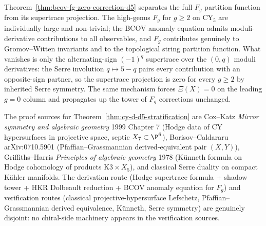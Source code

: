 \begin{remark}
\label{rem:cy-strat-d5-ghost-theorem}
Theorem~\ref{thm:bcov-fg-zero-correction-d5} separates the full
$F_g$ partition function from its supertrace projection. The
high-genus $F_g$ for $g \geq 2$ on CY$_5$ are individually large
and non-trivial; the BCOV anomaly equation admits moduli-derivative
contributions to all observables, and $F_g$ contributes genuinely to
Gromov--Witten invariants and to the topological string partition
function. What vanishes is only the alternating-sign $(-1)^q$
supertrace over the $(0, q)$ moduli derivatives: the Serre involution
$q \mapsto 5 - q$ pairs every contribution with an opposite-sign
partner, so the supertrace projection is zero for every $g \geq 2$
by inherited Serre symmetry. The same mechanism forces $\Xi(X) = 0$
on the leading $g = 0$ column and propagates up the tower of $F_g$
corrections unchanged.
\end{remark}

\begin{remark}[Proof sources for \texorpdfstring{$d = 5$}{d = 5}]
\label{rem:cy-strat-d5-sources}
The proof sources for Theorem~\ref{thm:cy-d-d5-stratification} are Cox--Katz
\emph{Mirror symmetry and algebraic geometry} 1999
Chapter 7 (Hodge data of CY hypersurfaces in projective space, septic
$X_7 \subset \P^6$), Borisov--Caldararu arXiv:0710.5901 (Pfaffian--Grassmannian
derived-equivalent pair $(X, Y)$), Griffiths--Harris \emph{Principles
of algebraic geometry} 1978 (K\"unneth formula on Hodge cohomology of
products $\mathrm{K3} \times X_5$), and classical Serre duality on
compact K\"ahler manifolds. The derivation route (Hodge supertrace
formula + shadow tower + HKR Dolbeault reduction + BCOV anomaly
equation for $F_g$) and verification routes (classical
projective-hypersurface Lefschetz, Pfaffian--Grassmannian derived
equivalence, K\"unneth, Serre symmetry) are genuinely disjoint: no
chiral-side machinery appears in the verification sources.
\end{remark}

